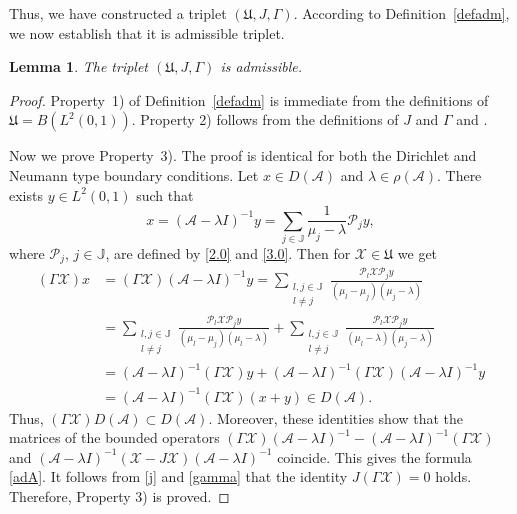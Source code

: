 \documentclass[11pt,centertags,reqno,twoside]{amsart}
\numberwithin{equation}{section}
\newtheorem{lemma}[theorem]{Lemma}
\theoremstyle{definition}
\theoremstyle{remark}
\begin{document}
Thus, we have constructed a triplet $(\mathfrak{U}, J, \Gamma)$.
According to Definition~\ref{defadm}, we now establish that it is admissible triplet.
\begin{lemma}\label{lh1}
The triplet $(\mathfrak{U}, J, \Gamma)$ is admissible.
\end{lemma}
\begin{proof}
Property~1) of Definition~\ref{defadm} is immediate from the definitions of
$\mathfrak{U}=B(L^2(0, 1))$. Property 2) follows from the definitions of $J$ and $\Gamma$
and \cite[Lemma~3.4]{BaskKrUsk}.

Now we prove Property~3). The proof is identical for both the Dirichlet and Neumann type boundary conditions.
Let $x\in D(\mathcal{A})$ and $\lambda\in\rho(\mathcal{A})$. There exists
$y\in L^2(0, 1)$ such that
\[
x=(\mathcal{A}-\lambda I)^{-1}y=\sum_{j\in\mathbb{J}}\frac{1}{\mu_j-\lambda}\mathcal{P}_jy,
\]
where $\mathcal{P}_j$, $j\in\mathbb{J}$, are defined by \eqref{2.0} and \eqref{3.0}. Then
for $\mathcal{X}\in\mathfrak{U}$ we get
\begin{align*}
(\Gamma\mathcal{X})x &= (\Gamma\mathcal{X})(\mathcal{A}-\lambda I)^{-1}y=
\sum\limits_{\substack{l, j\in\mathbb{J} \\ l\ne j}}
\frac{\mathcal{P}_l\mathcal{X}\mathcal{P}_jy}{(\mu_l-\mu_j)(\mu_j-\lambda)} \\
&= \sum\limits_{\substack{l, j\in\mathbb{J} \\ l\ne j}}
\frac{\mathcal{P}_l\mathcal{X}\mathcal{P}_jy}{(\mu_l-\mu_j)(\mu_l-\lambda)}+
\sum\limits_{\substack{l, j\in\mathbb{J} \\ l\ne j}}
\frac{\mathcal{P}_l\mathcal{X}\mathcal{P}_jy}{(\mu_l-\lambda)(\mu_j-\lambda)} \\
&= (\mathcal{A}-\lambda I)^{-1}(\Gamma\mathcal{X})y+(\mathcal{A}-\lambda I)^{-1}
(\Gamma\mathcal{X})(\mathcal{A}-\lambda I)^{-1}y \\
&= (\mathcal{A}-\lambda I)^{-1}(\Gamma\mathcal{X})(x+y)\in D(\mathcal{A}).
\end{align*}
Thus, $(\Gamma\mathcal{X})D(\mathcal{A})\subset D(\mathcal{A})$. Moreover,
these identities show that the matrices of the bounded operators
$(\Gamma\mathcal{X})(\mathcal{A}-\lambda I)^{-1}
-(\mathcal{A}-\lambda I)^{-1}(\Gamma\mathcal{X})$ and $(\mathcal{A}-\lambda
I)^{-1}(\mathcal{X}-J\mathcal{X})(\mathcal{A}-\lambda I)^{-1}$ coincide.
This gives the formula \eqref{adA}. It follows from \eqref{j} and \eqref{gamma}
that the identity $J(\Gamma\mathcal{X})=0$ holds. Therefore, Property 3) is proved.


\end{proof}
\end{document}
